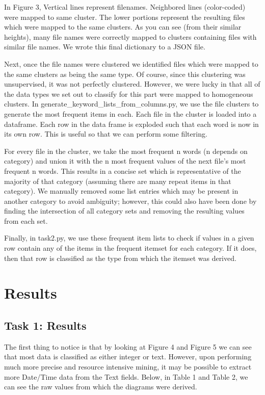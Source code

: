 \documentclass[sigconf,authordraft]{acmart}
\begin{document}
In Figure 3, Vertical lines represent filenames. Neighbored lines (color-coded) were mapped to same cluster. The lower portions represent the resulting files which were mapped to the same clusters. As you can see (from their similar heights), many file names were correctly mapped to clusters containing files with similar file names. We wrote this final dictionary to a JSON file.

Next, once the file names were clustered we identified files which were mapped to the same clusters as being the same type. Of course, since this clustering was unsupervised, it was not perfectly clustered. However, we were lucky in that all of the data types we set out to classify for this part were mapped to homogeneous clusters. In generate\_keyword\_lists\_from\_columns.py, we use the file clusters to generate the most frequent items in each. Each file in the cluster is loaded into a dataframe. Each row in the data frame is exploded such that each word is now in its own row. This is useful so that we can perform some filtering.

For every file in the cluster, we take the most frequent n words (n depends on category) and union it with the n most frequent values of the next file’s most frequent n words. This results in a concise set which is representative of the majority of that category (assuming there are many repeat items in that category). We manually removed some list entries which may be present in another category to avoid ambiguity; however, this could also have been done by finding the intersection of all category sets and removing the resulting values from each set.
 
Finally, in task2.py, we use these frequent item lists to check if values in a given row contain any of the items in the frequent itemset for each category. If it does, then that row is classified as the type from which the itemset was derived.

\section{Results}
\subsection{Task 1: Results}
The first thing to notice is that by looking at Figure 4 and Figure 5 we can see that most data is classified as either integer or text. However, upon performing much more precise and resource intensive mining, it may be possible to extract more Date/Time data from the Text fields. Below, in Table 1 and Table 2, we can see the raw values from which the diagrams were derived.
\end{document}
